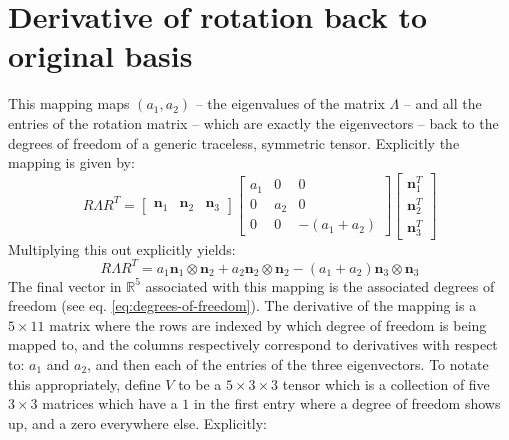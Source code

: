 \documentclass[reqno]{article}
\begin{document}
\section{Derivative of rotation back to original basis}
This mapping maps $(a_1, a_2)$ -- the eigenvalues of the matrix $\Lambda$ -- and all the entries of the rotation matrix -- which are exactly the eigenvectors -- back to the degrees of freedom of a generic traceless, symmetric tensor.
Explicitly the mapping is given by:
\begin{equation}
    R \Lambda R^T
    =
    \begin{bmatrix}
        \mathbf{n}_1 &\mathbf{n}_2 &\mathbf{n}_3
    \end{bmatrix}
    \begin{bmatrix}
        a_1 &0 &0 \\
        0 &a_2 &0 \\
        0 &0 &-(a_1 + a_2)
    \end{bmatrix}
    \begin{bmatrix}
        \mathbf{n}_1^T \\
        \mathbf{n}_2^T \\
        \mathbf{n}_3^T
    \end{bmatrix}
\end{equation}
Multiplying this out explicitly yields:
\begin{equation}
    R \Lambda R^T
    =
    a_1 \mathbf{n}_1 \otimes \mathbf{n}_2
    + a_2 \mathbf{n}_2 \otimes \mathbf{n}_2
    - (a_1 + a_2) \mathbf{n}_3 \otimes \mathbf{n}_3
\end{equation}
The final vector in $\mathbb{R}^5$ associated with this mapping is the associated degrees of freedom (see eq. \eqref{eq:degrees-of-freedom}).
The derivative of the mapping is a $5 \times 11$ matrix where the rows are indexed by which degree of freedom is being mapped to, and the columns respectively correspond to derivatives with respect to: $a_1$ and $a_2$, and then each of the entries of the three eigenvectors.
To notate this appropriately, define $V$ to be a $5 \times 3 \times 3$ tensor which is a collection of five $3\times 3$ matrices which have a $1$ in the first entry where a degree of freedom shows up, and a zero everywhere else.
Explicitly:
\end{document}
